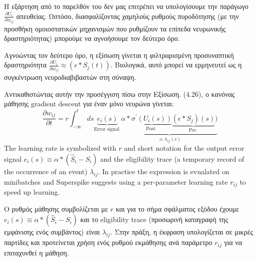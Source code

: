\documentclass[12pt]{report}
\begin{document}
Η εξάρτηση από το παρελθόν του δεν μας επιτρέπει να υπολογίσουμε την παράγωγο $\frac{{\partial U}_{i}}{\partial w_{i j}}$ απευθείας. Ωστόσο, διασφαλίζοντας χαμηλούς ρυθμούς πυροδότησης (με την προσθήκη ομοιοστατικών μηχανισμών που ρυθμίζουν τα επίπεδα νευρωνικής δραστηριότητας) μπορούμε να αγνοήσουμε τον δεύτερο όρο.

Αγνοώντας τον δεύτερο όρο, η εξίσωση γίνεται η φιλτραρισμένη προσυναπτική δραστηριότητα $\frac{\partial U_{i}}{\partial w_{i j}} \approx\left(\epsilon * S_{j}(t)\right)$. Βιολογικά, αυτό μπορεί να ερμηνευτεί ως η συγκέντρωση νευροδιαβιβαστών στη σύναψη.

Αντικαθιστώντας αυτήν την προσέγγιση πίσω στην Εξίσωση. (4.26), ο κανόνας μάθησης \textlatin{gradient descent} για έναν μόνο νευρώνα γίνεται:
\begin{equation}
\label{eqn:superspike}
\frac{\partial w_{i j}}{\partial t}=r \int_{-\infty}^{t} d s \underbrace{e_{i}(s)}_{\text {Error signal }} \underbrace{\alpha * \underbrace{\sigma^{\prime}\left(U_{i}(s)\right)}_{\text {Post }} \underbrace{\left(\epsilon * S_{j}\right)(s)}_{\text {Pre }})}_{\equiv \lambda_{i j}(s)}
\end{equation}
The learning rate is symbolized with $r$ and short notation for the output error signal $e_{i}(s) \equiv \alpha *\left(\hat{S}_{i}-S_{i}\right)$ and the eligibility trace (a temporary
record of the occurrence of an event)  $\lambda_{i j} .$ In practice the expression  is evualated on minibatches and Superspike suggests using a per-parameter learning rate $r_{i j}$ to speed up learning.

Ο ρυθμός μάθησης συμβολίζεται με $r$ και για το σήμα σφάλματος εξόδου έχουμε $e_{i}(s) \equiv \alpha *\left(\hat{S}_{i}-S_{i}\right)$ και το \textlatin{eligibility trace} (προσωρινή
καταγραφή της εμφάνισης ενός συμβάντος) είναι $\lambda_{i j} .$ Στην πράξη, η έκφραση υπολογίζεται σε μικρές παρτίδες και προτείνεται χρήση ενός ρυθμού εκμάθησης ανά παράμετρο $r_{i j}$ για να επιταχυνθεί η μάθηση.
\end{document}

